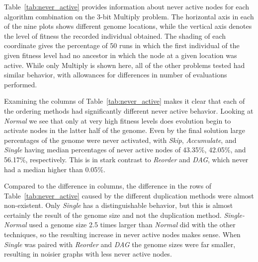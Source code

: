 \documentclass[journal]{IEEEtran}
\begin{document}
Table~\ref{tab:never_active} provides information about never active nodes for
each algorithm combination on the 3-bit Multiply problem.  The horizontal axis
in each of the nine plots shows different genome locations, while the vertical
axis denotes the level of fitness the recorded individual obtained.  The shading
of each coordinate gives the percentage of 50 runs in which the first individual of
the given fitness level had no ancestor in which the node at a given location was active.
While only Multiply is shown here, all of the
other problems tested had similar behavior, with allowances for differences in
number of evaluations performed.

Examining the columns of Table~\ref{tab:never_active} makes it clear that
each of the ordering methods had significantly different never active behavior.
Looking at \emph{Normal} we see that only at very high fitness levels does evolution
begin to activate nodes in the latter half of the genome.  Even by the final solution
large percentages of the genome were never activated, with \emph{Skip}, \emph{Accumulate},
and \emph{Single} having median percentages of never active nodes of 43.35\%, 42.05\%, and
56.17\%, respectively.  This is in stark contrast to \emph{Reorder} and \emph{DAG},
which never had a median higher than 0.05\%.

Compared to the difference in columns, the difference in the rows of Table~\ref{tab:never_active}
caused by the different duplication methods were almost non-existent.  Only
\emph{Single} has a distinguishable behavior, but this is almost certainly the result
of the genome size and not the duplication method.  \emph{Single-Normal} used
a genome size 2.5 times larger than \emph{Normal} did with the other techniques,
so the resulting increase in never active nodes makes sense.  When \emph{Single}
was paired with \emph{Reorder} and \emph{DAG} the genome sizes were far smaller,
resulting in noisier graphs with less never active nodes.
\end{document}
